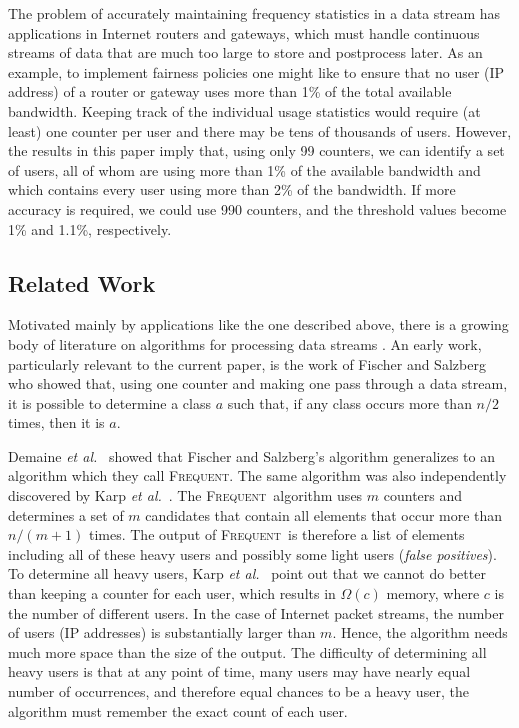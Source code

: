 \documentclass[charterfonts,lotsofwhite]{patmorin}
\newcommand{\frequent}{\textsc{Frequent}}
\newcommand{\comment}[1]{}
\newcommand{\etal}{\emph{et al.}}
\begin{document}
The problem of accurately maintaining frequency statistics in a data
stream has applications in Internet routers and gateways, which must
handle continuous streams of data that are much too large to store and
postprocess later.  As an example, to implement fairness policies one
might like to ensure that no user (IP address) of a router or gateway
uses more than 1\% of the total available bandwidth.  Keeping track of
the individual usage statistics would require (at least) one counter
per user and there may be tens of thousands of users.  However, the
results in this paper imply that, using only 99 counters, we can
identify a set of users, all of whom are using more than 1\% of the
available bandwidth and which contains every user using more than 2\%
of the bandwidth.  If more accuracy is required, we could use 990
counters, and the threshold values become 1\% and 1.1\%, respectively.
\comment{The accuracy of counters, and the ability to prove that they
are correct may be extremely useful, e.g., in proving that contractual
obligations have been met.}


\subsection{Related Work}
Motivated mainly by applications like the one described above, there
is a growing body of literature on algorithms for processing data
streams \cite{ams96,ccf02,dgim02,ev01,fsgm98,gm99,hnss95,i00,igms02,mm02}.
An early work, particularly relevant to the current paper, is the work
of Fischer and Salzberg \cite{fs82} who showed that, using one counter
and making one pass through a data stream, it is possible to determine
a class $a$ such that, if any class occurs more than $n/2$ times,
then it is $a$. 

Demaine \etal\ \cite{dlom02} showed that Fischer and
Salzberg's algorithm generalizes to an algorithm which they call
\frequent. The same algorithm was also independently 
discovered by Karp \etal\ \cite{kps03}. The \frequent\ algorithm 
uses $m$ counters and determines a set of $m$ candidates that contain 
all elements that occur more than $n/(m+1)$ times. The output of \frequent\
is therefore a list of elements including all of these heavy users and 
possibly some light users ({\it false positives}). To determine all heavy
users, Karp \etal\ \cite{kps03} point out that we cannot do better than 
keeping a counter for each user, which results in  $\Omega(c)$ memory, 
where $c$ is the number of different users. In the case of Internet 
packet streams, the number of users (IP addresses) is substantially larger 
than $m$. Hence, the algorithm needs much more space than the size of 
the output. The difficulty of determining all heavy users is that at any 
point of time, many users may have nearly equal number of occurrences, 
and therefore equal chances to be a heavy user, the algorithm must 
remember the exact count of each user. 
\end{document}
